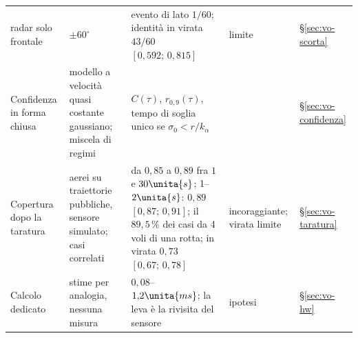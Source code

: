 \begin{table}[!htbp]
\begin{tabularx}{\textwidth}{@{}>{\RaggedRight\arraybackslash}p{3.1cm}>{\RaggedRight\arraybackslash}p{3.3cm}L>{\RaggedRight\arraybackslash}p{2.0cm}>{\RaggedRight\arraybackslash}p{1.05cm}@{}}
\quad radar solo frontale & $\pm60^\circ$ & evento di lato $1/60$; identità in virata $43/60$ $[0{,}592;\,0{,}815]$ & limite  & \S\ref{sec:vo-scorta}\\
Confidenza in forma chiusa & modello a velocità quasi costante gaussiano; miscela di regimi & $C(\tau)$, $r_{0,9}(\tau)$, tempo di soglia unico se $\sigma_0<r/k_\alpha$ &  & \S\ref{sec:vo-confidenza}\\
Copertura dopo la taratura & aerei su traiettorie pubbliche, sensore simulato; casi correlati & da $0{,}85$ a $0{,}89$ fra $1$ e $30\unita{s}$; 1--$2\unita{s}$: $0{,}89$ $[0{,}87;\,0{,}91]$; il $89{,}5\,\%$ dei casi da 4 voli di una rotta; in virata $0{,}73$ $[0{,}67;\,0{,}78]$ & incoraggiante; virata limite  & \S\ref{sec:vo-taratura}\\
Calcolo dedicato & stime per analogia, nessuna misura & $0{,}08$--$1{,}2\unita{ms}$; la leva è la rivisita del sensore & ipotesi  & \S\ref{sec:vo-hw}\\
\bottomrule
\end{tabularx}
\end{table}

